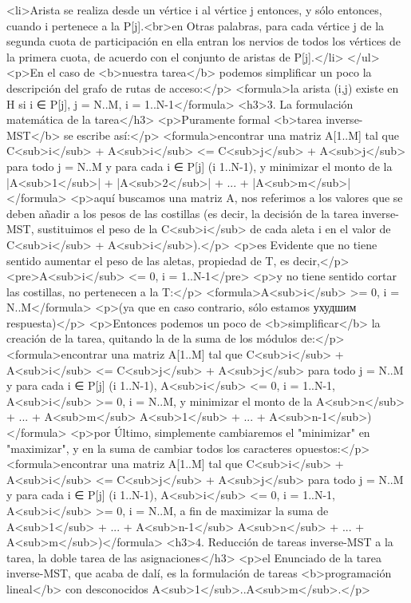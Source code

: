 <li>Arista se realiza desde un vértice i al vértice j entonces, y sólo entonces, cuando i pertenece a la P[j].<br>en Otras palabras, para cada vértice j de la segunda cuota de participación en ella entran los nervios de todos los vértices de la primera cuota, de acuerdo con el conjunto de aristas de P[j].</li>
</ul>
<p>En el caso de <b>nuestra tarea</b> podemos simplificar un poco la descripción del grafo de rutas de acceso:</p>
<formula>la arista (i,j) existe en H si i ∈ P[j], j = N..M, i = 1..N-1</formula>
<h3>3. La formulación matemática de la tarea</h3>
<p>Puramente formal <b>tarea inverse-MST</b> se escribe así:</p>
<formula>encontrar una matriz A[1..M] tal que
C<sub>i</sub> + A<sub>i</sub> <= C<sub>j</sub> + A<sub>j</sub> para todo j = N..M y para cada i ∈ P[j] (i 1..N-1),
y minimizar el monto de la |A<sub>1</sub>| + |A<sub>2</sub>| + ... + |A<sub>m</sub>|</formula>
<p>aquí buscamos una matriz A, nos referimos a los valores que se deben añadir a los pesos de las costillas (es decir, la decisión de la tarea inverse-MST, sustituimos el peso de la C<sub>i</sub> de cada aleta i en el valor de C<sub>i</sub> + A<sub>i</sub>).</p>
<p>es Evidente que no tiene sentido aumentar el peso de las aletas, propiedad de T, es decir,</p>
<pre>A<sub>i</sub> <= 0, i = 1..N-1</pre>
<p>y no tiene sentido cortar las costillas, no pertenecen a la T:</p>
<formula>A<sub>i</sub> >= 0, i = N..M</formula>
<p>(ya que en caso contrario, sólo estamos ухудшим respuesta)</p>
<p>Entonces podemos un poco de <b>simplificar</b> la creación de la tarea, quitando la de la suma de los módulos de:</p>
<formula>encontrar una matriz A[1..M] tal que
C<sub>i</sub> + A<sub>i</sub> <= C<sub>j</sub> + A<sub>j</sub> para todo j = N..M y para cada i ∈ P[j] (i 1..N-1),
A<sub>i</sub> <= 0, i = 1..N-1,
A<sub>i</sub> >= 0, i = N..M,
y minimizar el monto de la A<sub>n</sub> + ... + A<sub>m</sub> A<sub>1</sub> + ... + A<sub>n-1</sub>)</formula>
<p>por Último, simplemente cambiaremos el "minimizar" en "maximizar", y en la suma de cambiar todos los caracteres opuestos:</p>
<formula>encontrar una matriz A[1..M] tal que
C<sub>i</sub> + A<sub>i</sub> <= C<sub>j</sub> + A<sub>j</sub> para todo j = N..M y para cada i ∈ P[j] (i 1..N-1),
A<sub>i</sub> <= 0, i = 1..N-1,
A<sub>i</sub> >= 0, i = N..M,
a fin de maximizar la suma de A<sub>1</sub> + ... + A<sub>n-1</sub> A<sub>n</sub> + ... + A<sub>m</sub>)</formula>
<h3>4. Reducción de tareas inverse-MST a la tarea, la doble tarea de las asignaciones</h3>
<p>el Enunciado de la tarea inverse-MST, que acaba de dalí, es la formulación de tareas <b>programación lineal</b> con desconocidos A<sub>1</sub>..A<sub>m</sub>.</p>
